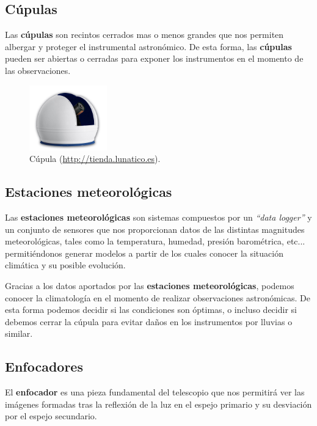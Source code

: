 \subsection{Cúpulas}
Las \textbf{cúpulas} son recintos cerrados mas o menos grandes que nos permiten albergar y proteger el instrumental astronómico. De esta forma, las \textbf{cúpulas} pueden ser abiertas o cerradas para exponer los instrumentos en el momento de las observaciones.

\bigskip
\begin{figure}[!ht]
	\begin{center}
		\includegraphics[width=0.3\textwidth]{../images/cupula.jpg}
		\caption[Cúpula]{Cúpula (\href{http://tienda.lunatico.es}{http://tienda.lunatico.es}).}
		\label{fig:diag_scrum}
	\end{center}
\end{figure}


\subsection{Estaciones meteorológicas}

Las \textbf{estaciones meteorológicas} son sistemas compuestos por un \textit{``data logger''} y un conjunto de sensores que nos proporcionan datos de las distintas magnitudes meteorológicas, tales como la temperatura, humedad, presión barométrica, etc... permitiéndonos generar modelos a partir de los cuales conocer la situación climática y su posible evolución. 

\bigskip
Gracias a los datos aportados por las \textbf{estaciones meteorológicas}, podemos conocer la climatología en el momento de realizar observaciones astronómicas. De esta forma podemos decidir si las condiciones son óptimas, o incluso decidir si debemos cerrar la cúpula para evitar daños en los instrumentos por lluvias o similar. 



\subsection{Enfocadores}

El \textbf{enfocador} es una pieza fundamental del telescopio que nos permitirá ver las imágenes formadas tras la reflexión de la luz en el espejo primario y su desviación por el espejo secundario.

